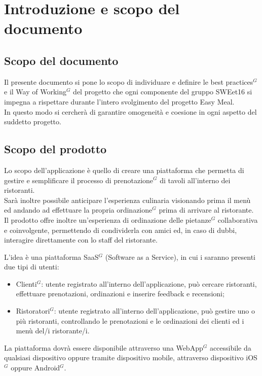 \section{Introduzione e scopo del documento}

    \subsection{Scopo del documento}

    Il presente documento si pone lo scopo di individuare e definire le best practices$^{G}$ e il Way of Working$^{G}$ del progetto che ogni componente del gruppo SWEet16
    si impegna a rispettare durante l’intero svolgimento del progetto Easy Meal. \\
    In questo modo si cercherà di garantire omogeneità e coesione in ogni aspetto del suddetto progetto.
  
    \subsection{Scopo del prodotto}

    Lo scopo dell’applicazione è quello di creare una piattaforma che permetta di gestire e semplificare il processo di prenotazione$^{G}$ di tavoli all’interno dei ristoranti. \\
    Sarà inoltre possibile anticipare l’esperienza culinaria visionando prima il menù ed andando ad effettuare la propria ordinazione$^{G}$ prima di arrivare al ristorante. \\
    Il prodotto offre inoltre un’esperienza di ordinazione delle pietanze$^{G}$ collaborativa e coinvolgente, permettendo di condividerla con amici ed, in caso di dubbi, interagire direttamente con lo staff del ristorante.

    L’idea è una piattaforma SaaS$^{G}$ (Software as a Service), in cui i saranno presenti due tipi di utenti:
    \begin{itemize}
        \item Clienti$^{G}$: utente registrato all’interno dell’applicazione, può cercare ristoranti, effettuare prenotazioni, ordinazioni e inserire feedback e recensioni;
        \item Ristoratori$^{G}$: utente registrato all’interno dell’applicazione, può gestire uno o più ristoranti, controllando le prenotazioni e le ordinazioni dei clienti ed i menù del/i ristorante/i.
    \end{itemize}


    La piattaforma dovrà essere  disponibile attraverso una WebApp$^{G}$ accessibile da qualsiasi dispositivo oppure tramite dispositivo mobile, attraverso dispositivo iOS$^{G}$ oppure Android$^{G}$.

